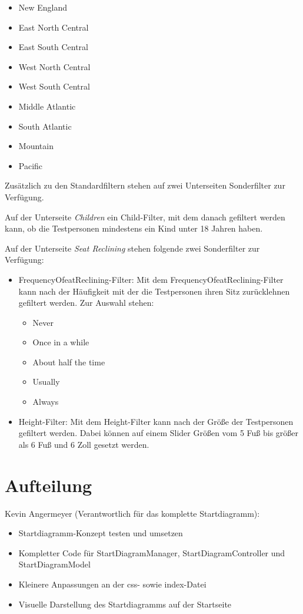 \documentclass{mi-seminar}
\begin{document}
\begin{itemize}
	\begin{itemize}
	\item New England
	\item East North Central
	\item East South Central
	\item West North Central
	\item West South Central
	\item Middle Atlantic
	\item South Atlantic
	\item Mountain
	\item Pacific
	\end{itemize}
\end{itemize}

Zusätzlich zu den Standardfiltern stehen auf zwei Unterseiten Sonderfilter zur Verfügung. 

Auf der Unterseite \textit{Children} ein Child-Filter, mit dem danach gefiltert werden kann, ob die Testpersonen mindestens ein Kind unter 18 Jahren haben. 

Auf der Unterseite \textit{Seat Reclining} stehen folgende zwei Sonderfilter zur Verfügung: 
\begin{itemize}
\item FrequencyOfeatReclining-Filter: Mit dem FrequencyOfeatReclining-Filter kann nach der Häufigkeit mit der die Testpersonen ihren Sitz zurücklehnen gefiltert werden. Zur Auswahl stehen:
	\begin{itemize}
	\item Never
	\item Once in a while
	\item About half the time
	\item Usually
	\item Always
	\end{itemize}
\item Height-Filter: Mit dem Height-Filter kann nach der Größe der Testpersonen gefiltert werden. Dabei können auf einem Slider Größen vom 5 Fuß bis größer als 6 Fuß und 6 Zoll gesetzt werden.
\end{itemize} 

\section{Aufteilung}
Kevin Angermeyer (Verantwortlich für das komplette Startdiagramm):
\begin{itemize}
\item Startdiagramm-Konzept testen und umsetzen
\item Kompletter Code für StartDiagramManager, StartDiagramController und StartDiagramModel 
\item Kleinere Anpassungen an der css- sowie index-Datei
\item Visuelle Darstellung des Startdiagramms auf der Startseite
\end{itemize}
\end{document}
